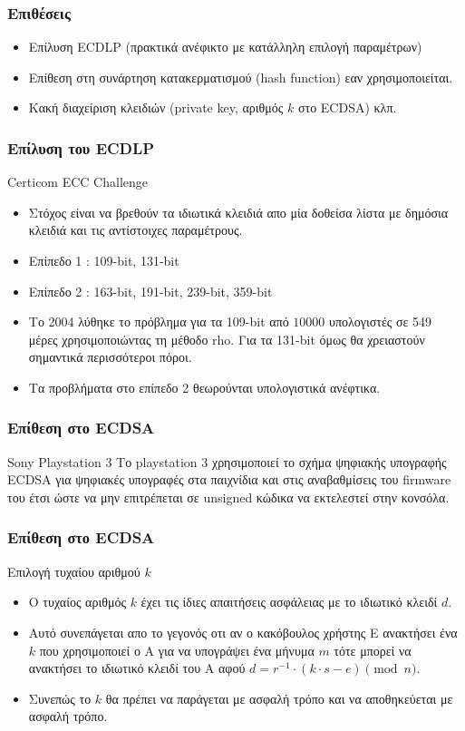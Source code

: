 \documentclass{beamer}
\begin{document}
%
\begin{frame}
\frametitle{Επιθέσεις}
\begin{itemize}
\item Επίλυση ECDLP (πρακτικά ανέφικτο με κατάλληλη επιλογή παραμέτρων)
\item Επίθεση στη συνάρτηση κατακερματισμού (hash function) εαν χρησιμοποιείται.
\item  Κακή διαχείριση κλειδιών (private key, αριθμός $k$ στο ECDSA) κλπ.
\end{itemize}
\end{frame}

%
\begin{frame}
\frametitle{Επίλυση του ECDLP}
\begin{block}
{Certicom ECC Challenge}
\begin{itemize}
\item Στόχος είναι να βρεθούν τα ιδιωτικά κλειδιά απο μία δοθείσα λίστα με δημόσια κλειδιά και τις αντίστοιχες παραμέτρους.
\item Επίπεδο 1 : 109-bit, 131-bit
\item Επίπεδο 2 : 163-bit, 191-bit, 239-bit, 359-bit
\item Το 2004 λύθηκε το πρόβλημα για τα 109-bit από $10000$ υπολογιστές σε 549 μέρες χρησιμοποιώντας τη μέθοδο rho. Για τα 131-bit όμως θα χρειαστούν σημαντικά περισσότεροι πόροι.
\item Τα προβλήματα στο επίπεδο 2 θεωρούνται υπολογιστικά ανέφτικα.
\end{itemize}
\end{block}
\end{frame}

%
\begin{frame}
\frametitle{Επίθεση στο ECDSA}
\begin{block}
{Sony Playstation 3}
Το playstation 3 χρησιμοποιεί το σχήμα ψηφιακής υπογραφής ECDSA για ψηφιακές υπογραφές στα παιχνίδια και στις αναβαθμίσεις του firmware του έτσι ώστε να μην επιτρέπεται σε unsigned κώδικα να εκτελεστεί στην κονσόλα.
\end{block}
\end{frame}

%
\begin{frame}
\frametitle{Επίθεση στο ECDSA}
\begin{block}
{Επιλογή τυχαίου αριθμού $k$}
\begin{itemize}
\item Ο τυχαίος αριθμός $k$ έχει τις ίδιες απαιτήσεις ασφάλειας με το ιδιωτικό κλειδί $d$. 
\item Αυτό συνεπάγεται απο το γεγονός οτι αν ο κακόβουλος χρήστης Ε ανακτήσει ένα $k$ που χρησιμοποιεί ο Α για να υπογράψει ένα μήνυμα $m$ τότε μπορεί να ανακτήσει το ιδιωτικό κλειδί του A αφού $d = r^{-1} \cdot (k \cdot s - e) \pmod n$.
\item Συνεπώς το $k$ θα πρέπει να παράγεται με ασφαλή τρόπο και να αποθηκεύεται με ασφαλή τρόπο.
\end{itemize}
\end{block}
\end{frame}
\end{document}
